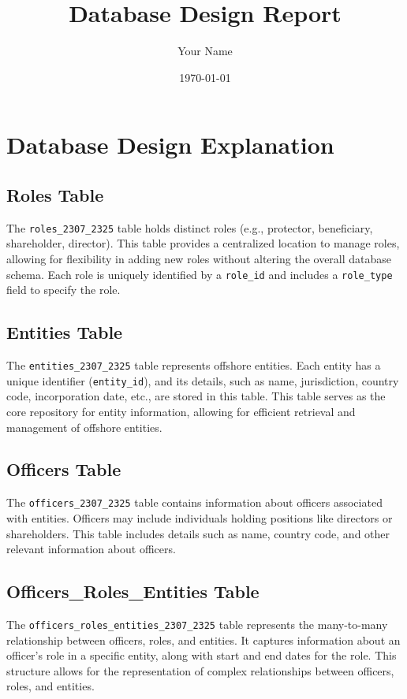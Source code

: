 \documentclass{article}
\title{Database Design Report}
\author{Your Name}
\date{\today}
\begin{document}
\maketitle

\section*{\centering Database Design Explanation}


\subsection*{Roles Table}
The \texttt{roles\_2307\_2325} table holds distinct roles (e.g., protector, beneficiary, shareholder, director). This table provides a centralized location to manage roles, allowing for flexibility in adding new roles without altering the overall database schema. Each role is uniquely identified by a \texttt{role\_id} and includes a \texttt{role\_type} field to specify the role.

\subsection*{Entities Table}
The \texttt{entities\_2307\_2325} table represents offshore entities. Each entity has a unique identifier (\texttt{entity\_id}), and its details, such as name, jurisdiction, country code, incorporation date, etc., are stored in this table. This table serves as the core repository for entity information, allowing for efficient retrieval and management of offshore entities.

\subsection*{Officers Table}
The \texttt{officers\_2307\_2325} table contains information about officers associated with entities. Officers may include individuals holding positions like directors or shareholders. This table includes details such as name, country code, and other relevant information about officers.

\subsection*{Officers\_Roles\_Entities Table}
The \texttt{officers\_roles\_entities\_2307\_2325} table represents the many-to-many relationship between officers, roles, and entities. It captures information about an officer's role in a specific entity, along with start and end dates for the role. This structure allows for the representation of complex relationships between officers, roles, and entities.
\end{document}
